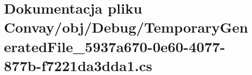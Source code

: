 \hypertarget{_convay_2obj_2_debug_2_temporary_generated_file__5937a670-0e60-4077-877b-f7221da3dda1_8cs}{}\section{Dokumentacja pliku Convay/obj/\+Debug/\+Temporary\+Generated\+File\+\_\+5937a670-\/0e60-\/4077-\/877b-\/f7221da3dda1.cs}
\label{_convay_2obj_2_debug_2_temporary_generated_file__5937a670-0e60-4077-877b-f7221da3dda1_8cs}
